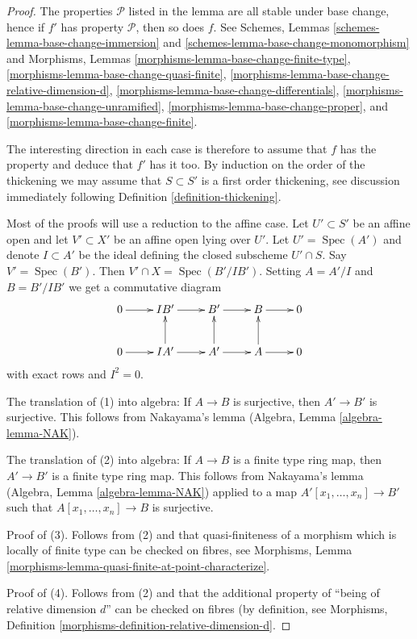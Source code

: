 \documentclass[10pt,a4paper]{amsart}
\theoremstyle{plain}
\theoremstyle{definition}
\theoremstyle{remark}
\numberwithin{equation}{subsection}
\def\Spec{\mathop{\mathrm{Spec}}}
\begin{document}
\begin{proof}
The properties $\mathcal{P}$ listed in the lemma are all stable
under base change, hence if $f'$ has property $\mathcal{P}$, then so
does $f$. See
Schemes, Lemmas \ref{schemes-lemma-base-change-immersion} and
\ref{schemes-lemma-base-change-monomorphism}
and
Morphisms, Lemmas
\ref{morphisms-lemma-base-change-finite-type},
\ref{morphisms-lemma-base-change-quasi-finite},
\ref{morphisms-lemma-base-change-relative-dimension-d},
\ref{morphisms-lemma-base-change-differentials},
\ref{morphisms-lemma-base-change-unramified},
\ref{morphisms-lemma-base-change-proper}, and
\ref{morphisms-lemma-base-change-finite}.

\medskip\noindent
The interesting direction in each case is therefore to assume
that $f$ has the property and deduce that $f'$ has it too.
By induction on the order of the thickening we may
assume that $S \subset S'$ is a first order thickening, see
discussion immediately following
Definition \ref{definition-thickening}.

\medskip\noindent
Most of the proofs will use a reduction to the affine case. Let
$U' \subset S'$ be an affine open and let $V' \subset X'$ be an affine open
lying over $U'$. Let $U' = \Spec(A')$ and denote $I \subset A'$ be the ideal
defining the closed subscheme $U' \cap S$. Say $V' = \Spec(B')$.
Then $V' \cap X = \Spec(B'/IB')$. Setting $A = A'/I$ and
$B = B'/IB'$ we get a commutative diagram
$$
\xymatrix{
0 \ar[r] &
IB' \ar[r] &
B' \ar[r] &
B \ar[r] & 0 \\
0 \ar[r] &
IA' \ar[r] \ar[u] &
A' \ar[r] \ar[u] &
A \ar[r] \ar[u] & 0
}
$$
with exact rows and $I^2 = 0$.

\medskip\noindent
The translation of (1) into algebra: If $A \to B$ is surjective,
then $A' \to B'$ is surjective. This follows from
Nakayama's lemma (Algebra, Lemma \ref{algebra-lemma-NAK}).

\medskip\noindent
The translation of (2) into algebra: If $A \to B$ is a finite type ring
map, then $A' \to B'$ is a finite type ring map. This follows from
Nakayama's lemma (Algebra, Lemma \ref{algebra-lemma-NAK})
applied to a map $A'[x_1, \ldots, x_n] \to B'$ such that
$A[x_1, \ldots, x_n] \to B$ is surjective.

\medskip\noindent
Proof of (3).  Follows from (2) and that quasi-finiteness of a morphism
which is locally of finite type can be checked on fibres, see
Morphisms, Lemma \ref{morphisms-lemma-quasi-finite-at-point-characterize}.

\medskip\noindent
Proof of (4). Follows from (2) and that the additional property of ``being of
relative dimension $d$'' can be checked on fibres (by definition, see
Morphisms, Definition \ref{morphisms-definition-relative-dimension-d}.


\end{proof}
\end{document}
